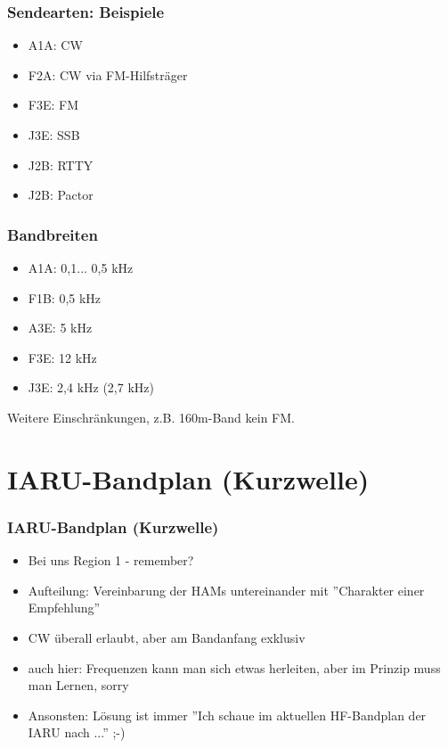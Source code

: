 \begin{frame}
    \frametitle{Sendearten: Beispiele}

    \begin{itemize}
        \item A1A: CW
        \item F2A: CW via FM-Hilfsträger
        \item F3E: FM
        \item J3E: SSB
        \item J2B: RTTY
        \item J2B: Pactor
    \end{itemize}

\end{frame}

\begin{frame}
    \frametitle{Bandbreiten}

    \begin{itemize}
        \item A1A: 0,1... 0,5 kHz 
        \item F1B: 0,5 kHz 
        \item A3E: 5 kHz 
        \item F3E: 12 kHz 
        \item J3E: 2,4 kHz (2,7 kHz)
    \end{itemize}

    Weitere Einschränkungen, z.B. 160m-Band kein FM.

\end{frame}


\section{IARU-Bandplan (Kurzwelle)}

\begin{frame}
    \frametitle{IARU-Bandplan (Kurzwelle)}

    
    \begin{itemize}
        \item Bei uns Region 1 - remember?
        \item Aufteilung: Vereinbarung der HAMs untereinander mit ''Charakter
              einer Empfehlung''
        \item CW überall erlaubt, aber am Bandanfang exklusiv
        \item auch hier: Frequenzen kann man sich etwas herleiten, aber im
              Prinzip muss man Lernen, sorry
        \item Ansonsten: Lösung ist immer ''Ich schaue im aktuellen HF-Bandplan
              der IARU nach ...'' ;-)
    \end{itemize}

\end{frame}

